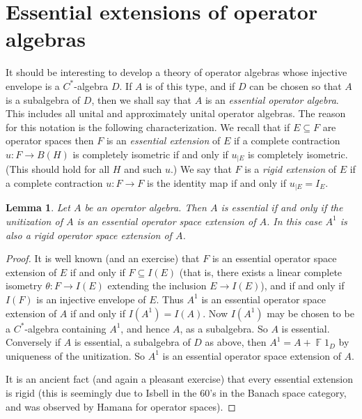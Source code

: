 \documentclass{amsart}
\newtheorem{lemma}[theorem]{Lemma}
\theoremstyle{remark}
\theoremstyle{definition}
\numberwithin{equation}{section}
\DeclareMathOperator{\Fdb}{{\mathbb F}}
\begin{document}
  \section{Essential extensions of operator algebras} \label{sess}

  It should be interesting to develop a theory of 
 operator algebras whose injective envelope is a $C^*$-algebra $D$.   
 If  $A$ is of this type, and if $D$ can be chosen so that $A$ is a subalgebra of  $D$, then we shall say that $A$ is an {\em  essential operator algebra}.  
 This includes all unital and approximately unital operator algebras.  The reason for this notation is the following characterization. We recall that if $E \subseteq F$ are operator spaces then $F$ is an {\em essential  
 extension} of $E$ if a complete contraction 
 $u : F \to B(H)$ is completely isometric if and only if $u_{|E}$ is completely isometric.  (This should hold for all $H$ and such $u$.)  We say  that $F$ is a  {\em rigid  
 extension} of $E$ if a complete contraction 
 $u : F \to F$ is the identity map if and only if $u_{|E} = I_E$.
 
\begin{lemma} \label{ess}   Let $A$ be  an operator  algebra. Then $A$ is essential
   if and only if  the unitization of $A$  is an essential operator space extension of $A$.  
   In this case $A^1$ is also a rigid operator space extension of $A$.
   \end{lemma}
  
\begin{proof}   It is well known (and an exercise) that $F$ is an 
essential operator space extension of $E$ if and only if $F \subseteq I(E)$ (that is, there exists 
a linear complete isometry $\theta : F \to I(E)$ extending the inclusion $E \to I(E)$), and if and only if $I(F)$ is
an injective envelope of $E$.   
Thus $A^1$  is an essential operator space extension of $A$ if and only if $I(A^1) = I(A)$.  Now $I(A^1)$ may be chosen to be a  $C^*$-algebra containing $A^1$, and hence $A$, as a subalgebra.  So $A$ is essential.
Conversely if $A$ is essential, a subalgebra of $D$ as above,
then $A^1 = A + \Fdb 1_D$ by uniqueness of the unitization.  So $A^1$ is an essential operator space extension of $A$. 

It is an ancient fact (and again a pleasant exercise) that every essential extension is rigid (this is seemingly due to Isbell in the 60's in the Banach space category, and was observed by Hamana for operator spaces).   
\end{proof}
\end{document}
